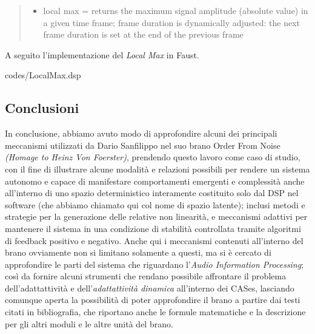 \begin{quote}
    \begin{itemize}
      \item local max = returns the maximum signal amplitude (absolute value) 
      in a given time frame; frame duration is dynamically adjusted: 
      the next frame duration is set at the end of the previous frame
    \end{itemize}
    \end{quote}

A seguito l'implementazione del \textit{Local Max} in Faust.

\vspace{0.5cm} 

{codes/LocalMax.dsp}

\subsection{Conclusioni}
\label{sec:Conclusioni}

In conclusione, abbiamo avuto modo di approfondire alcuni dei principali meccanismi 
utilizzati da Dario Sanfilippo nel suo brano Order From Noise \textit{(Homage to Heinz Von Foerster)},
prendendo questo lavoro come caso di studio, con il fine di illustrare
alcune modalità e relazioni possibili per rendere un sistema autonomo e 
capace di manifestare comportamenti emergenti e complessità anche all'interno di uno 
spazio deterministico interamente costituito solo dal DSP nel software 
(che abbiamo chiamato qui col nome di spazio latente); 
inclusi metodi e strategie per la generazione delle relative non linearità,
e meccanismi adattivi per mantenere il sistema in una condizione di stabilità
controllata tramite algoritmi di feedback positivo e negativo.
Anche qui i meccanismi contenuti all'interno del brano ovviamente non si limitano solamente a questi,
ma si è cercato di approfondire le parti del sistema che riguardano l'\textit{Audio Information Processing};
così da fornire alcuni strumenti che rendano possibile affrontare il problema 
dell'adattattività e dell'\textit{adattattività dinamica}
all'interno dei CASes, lasciando comunque aperta la possibilità 
di poter approfondire il brano a partire
dai testi citati in bibliografia, che riportano anche le formule matematiche e la descrizione
per gli altri moduli e le altre unità del brano.